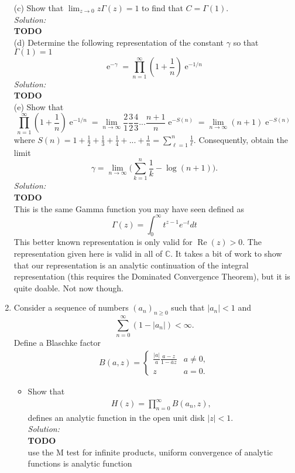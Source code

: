 \documentclass[10pt]{amsart}
\DeclareMathOperator{\E}{e}
\theoremstyle{nonumberplain}
\begin{document}
\begin{enumerate}[label={\bf {\arabic*}:}]
\noindent
(c) Show that $\lim_{z\rightarrow 0} z \Gamma(z) = 1$ to find that $C = \Gamma(1)$. \\
\textit{Solution:} \\
\textbf{TODO} \\

\noindent
(d) Determine the following representation of the constant $\gamma$ so that $\Gamma(1) = 1$
$$
\E^{-\gamma} = \prod_{n = 1}^\infty \left(1 + \frac 1 n\right)\E^{-1/n}
$$
\textit{Solution:} \\
\textbf{TODO} \\

\noindent
(e) Show that
$$
\prod_{n=1}^\infty \left(1 + \frac 1 n \right)\E^{-1/n}
	= \lim_{n\rightarrow\infty} \frac 2 1 \frac 3 2 \frac 4 3 ... \frac {n + 1} n \E^{-S(n)}
	= \lim_{n\rightarrow\infty} (n + 1) \E^{-S(n)}
$$
where $S(n) = 1 + \frac 1 2 + \frac 1 3 + \frac 1 4 + ... + \frac 1 n = \sum_{\ell=1}^n \frac 1 \ell$.
Consequently, obtain the limit
$$
\gamma = \lim_{n\rightarrow\infty} \Bigg(  \sum_{k=1}^n \frac 1 k - \log(n + 1)  \Bigg).
$$
\textit{Solution:} \\
\textbf{TODO} \\

\noindent
This is the same Gamma function you may have seen defined as
$$
\Gamma(z)=\int_0^{\infty} t^{z-1} e^{-t} d t
$$
This better known representation is only valid for
$\operatorname{Re}(z)>0$. The representation given here is valid in
all of $\mathbb{C}$. It takes a bit of work to show that our
representation is an analytic continuation of the integral
representation (this requires the Dominated Convergence Theorem), but
it is quite doable. Not now though. \\
\newpage

\item Consider a sequence of numbers $(a_n)_{n \geq 0}$ such that $|a_n| < 1$ and
$$ \sum_{n = 0}^\infty (1 - |a_n|) < \infty. $$
Define a Blaschke factor
\begin{align*}
B(a,z) =
	\begin{cases}
		\frac{|a|}{a} \frac{ a - z}{ 1 - \bar a z} & a \neq 0,\\
  		z & a  =0.
  	\end{cases}
\end{align*}
\begin{itemize}
\item Show that
\begin{align*}
H(z) = \prod_{n=0}^\infty B(a_n,z),
\end{align*}
defines an analytic function in the open unit disk $|z| < 1$. \\
\textit{Solution:} \\
\textbf{TODO} \\
use the M test for infinite products, uniform convergence of analytic functions is analytic function \\
  

\end{itemize}
\end{enumerate}
\end{document}
